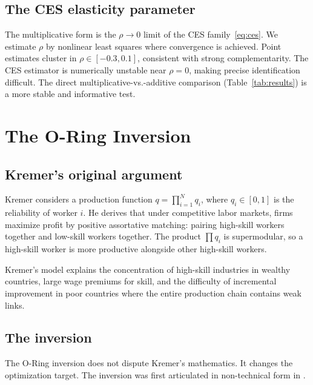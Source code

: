 \documentclass[12pt, a4paper]{article}
\theoremstyle{definition}
\theoremstyle{remark}
\begin{document}
\subsection{The CES elasticity parameter}\label{sec:ces}

The multiplicative form is the $\rho \to 0$ limit of the CES family~\eqref{eq:ces}. We estimate $\rho$ by nonlinear least squares where convergence is achieved. Point estimates cluster in $\rho \in [-0.3, 0.1]$, consistent with strong complementarity. The CES estimator is numerically unstable near $\rho = 0$, making precise identification difficult. The direct multiplicative-vs.-additive comparison (Table~\ref{tab:results}) is a more stable and informative test.


\section{The O-Ring Inversion}\label{sec:oring}

\subsection{Kremer's original argument}

Kremer \cite{kremer1993} considers a production function $q = \prod_{i=1}^{N} q_i$, where $q_i \in [0, 1]$ is the reliability of worker $i$. He derives that under competitive labor markets, firms maximize profit by positive assortative matching: pairing high-skill workers together and low-skill workers together. The product $\prod q_i$ is supermodular, so a high-skill worker is more productive alongside other high-skill workers.

Kremer's model explains the concentration of high-skill industries in wealthy countries, large wage premiums for skill, and the difficulty of incremental improvement in poor countries where the entire production chain contains weak links.

\subsection{The inversion}

The O-Ring inversion does not dispute Kremer's mathematics. It changes the optimization target. The inversion was first articulated in non-technical form in \cite{kirsch2025}.
\end{document}
